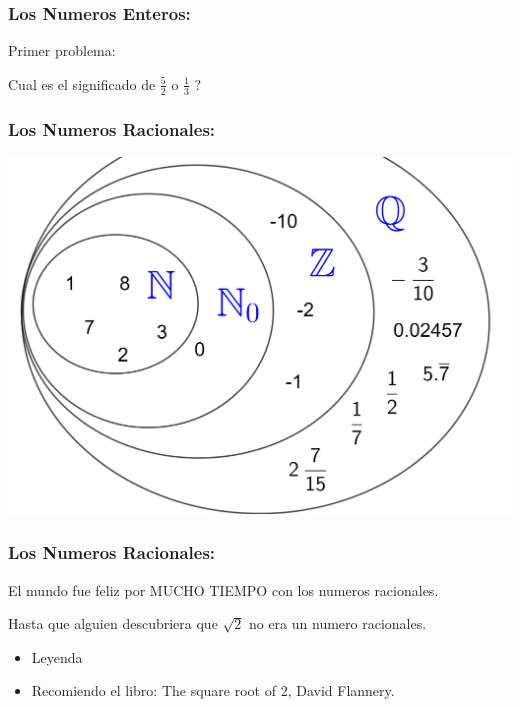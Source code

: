 \documentclass{beamer}
\theoremstyle{thmstyle}
\theoremstyle{thmstyle}
\theoremstyle{thmstyle}
\theoremstyle{mystyle}
\theoremstyle{qstnstyle}
\begin{document}
\begin{frame}
\frametitle{Los Numeros Enteros:}
{\huge{
Primer problema: }}
\vspace{10mm}
\begin{itemize}


\Large{
\item Cual es el significado de $\frac{5}{2}$ o $\frac{1}{3}$ ?}
\end{itemize}

\end{frame}


\begin{frame}
\frametitle{Los Numeros Racionales:}
\begin{center}
\includegraphics[width=0.75\linewidth]{Image4.png}
\end{center}
\end{frame}

\begin{frame}
\frametitle{Los Numeros Racionales:}
El mundo fue feliz por MUCHO TIEMPO con los numeros racionales.

\pause
\vspace{10mm}
Hasta que alguien descubriera que $\sqrt{2}$ no era un numero racionales.

\begin{itemize}
\item Leyenda

\item Recomiendo el libro: The square root of 2, David Flannery.
\end{itemize}
\end{frame}
\end{document}

